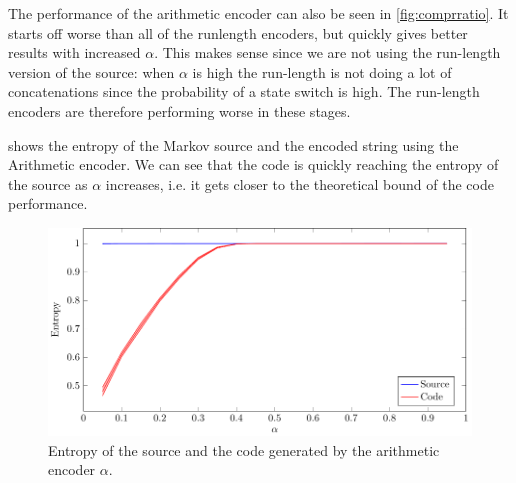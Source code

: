 \documentclass{article}
\begin{document}
The performance of the arithmetic encoder can also be seen in \cref{fig:comprratio}.
It starts off worse than all of the runlength encoders,
but quickly gives better results with increased $\alpha$.
This makes sense since we are not using the run-length version of the source:
when $\alpha$ is high the run-length is not doing a lot of concatenations
since the probability of a state switch is high.
The run-length encoders are therefore performing worse in these stages.

 shows the entropy of the Markov source and the encoded string using the Arithmetic encoder.
We can see that the code is quickly reaching the entropy of the source as $\alpha$ increases,
i.e. it gets closer to the theoretical bound of the code performance.

\begin{figure}[!ht]
  \centering
  \includegraphics{../tikz/entropy/entropy.pdf}
  \caption{Entropy of the source and the code generated by the arithmetic encoder $\alpha$.}
  \label{fig:entropy}
\end{figure}
\end{document}
